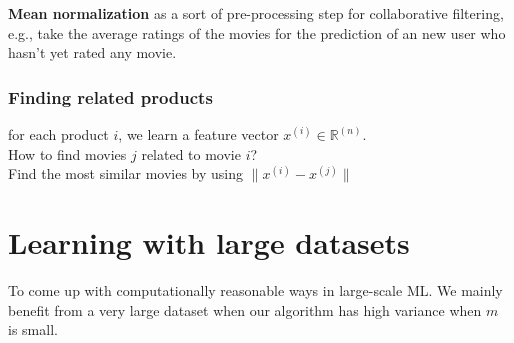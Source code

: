 \textbf{Mean normalization} as a sort of pre-processing step for collaborative filtering, e.g., take the average ratings of the movies for the prediction of an new user who hasn't yet rated any movie.

\subsubsection{Finding related products}
for each product $i$, we learn a feature vector $x^{(i)} \in \mathbb{R}^{(n)}$.\\
How to find movies $j$ related to movie $i$?\\
Find the most similar movies by using $\|x^{(i)} - x^{(j)}\|$


\section{Learning with large datasets}
\label{sec:Learning with large datasets}
To come up with computationally reasonable ways in large-scale ML. We mainly benefit from a very large dataset when our algorithm has high variance when $m$ is small.

%
